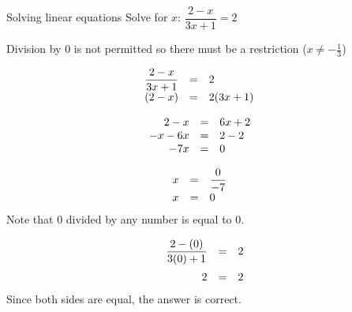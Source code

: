 \begin{wex}{Solving linear equations }
{Solve for $x$: $\dfrac{2-x}{3x+1}=2$} 
{
Division by $0$ is not permitted so there must be a restriction ($x\neq -\frac{1}{3}$)

\begin{equation*}
    \begin{array}{ccll}\hfill \dfrac{2-x}{3x+1}& =& 2\hfill & \\
	\hfill (2-x)& =& 2(3x+1)\hfill & \\ 
    \end{array}
\end{equation*}

\begin{equation*}
    \begin{array}{ccll}
	\hfill 2-x& =& 6x+2\hfill & \hfill \\ 
	\hfill -x-6x& =& 2-2\hfill & \hfill \\ 
	\hfill -7x& =& 0\hfill & \hfill
    \end{array}
\end{equation*}

\begin{equation*}
    \begin{array}{ccll}

	\hfill x& =& \dfrac{0}{-7}\hfill & \\
	\hfill x& =& 0\hfill & \hfill 
    \end{array}
\end{equation*}
Note that $0$ divided by any number is equal to $0$.


\begin{equation*}
    \begin{array}{ccc}\hfill \dfrac{2-(0)}{3(0)+1}& =& 2\hfill \vspace{6pt}\\
	\hfill 2& =& 2\hfill 
\end{array}
\end{equation*}
Since both sides are equal, the answer is correct.
}
\end{wex}


